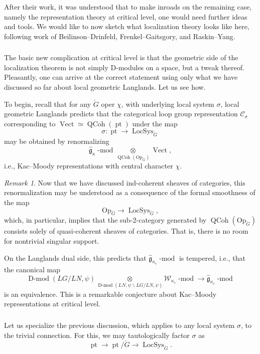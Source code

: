 \documentclass[10pt]{amsart}
\newcommand{\pt}{\on{pt}}
\newcommand{\fgc}{\widehat{\fg}_{\kappa_c}}
\newcommand{\fgk}{\widehat{\fg}_\kappa}
\newcommand{\Op}{\mathrm{Op}_{\cG}}
\newcommand{\LS}{\on{LocSys}_{\cG}}
\newcommand{\fg}{\mathfrak{g}}
\newcommand{\on}{\operatorname}
\renewcommand{\mod}{\on{-mod}}
\newcommand{\Dmod}{\on{D-mod}}
\newcommand{\Vect}{\on{Vect}}
\theoremstyle{remark}
\newtheorem{re}[subsubsection]{Remark}
\numberwithin{equation}{section}
\newcommand{\cG}{\check{G}}
\newcommand{\sC}{\mathscr{C}}
\renewcommand{\mod}{\operatorname{-mod}}
\newcommand{\QCoh}{\on{QCoh}}
\begin{document}
	 
	After their work, it was understood that to make inroads on the remaining case, namely the representation theory at critical level, one would need further ideas and tools. We would like to now 
	sketch what localization theory looks like here, following work of Beilinson--Drinfeld, Frenkel--Gaitsgory, and 
	Raskin--Yang. 
	
	\subsubsection{}  The basic new complication at critical level is that the geometric side of the localization theorem is not simply D-modules on a space, but a tweak thereof. Pleasantly, one can arrive at the correct statement using only what we have discussed so far about local geometric Langlands. Let us see how.
	
	
	
	To begin, recall that for any $\cG$ oper $\chi$, 
	with underlying local system $\sigma$, local geometric Langlands predicts 
	that the categorical loop group representation $\sC_{\sigma}$ corresponding 
	to $\Vect \simeq \QCoh(\pt)$ under the map $$\sigma: \pt \rightarrow \LS$$ 
	may be 
	obtained by renormalizing 
	\[
	  \fgk\mod \underset{\QCoh(\Op)} \otimes \Vect,
	\]
	i.e., Kac--Moody representations with central character $\chi$. 
	
	
   \begin{re} Now that we have discussed ind-coherent sheaves of categories, 
   this renormalization may be understood as a consequence of the formal smoothness of 
   the map $$\Op 
   \rightarrow \LS,$$which, in particular, implies that the sub-2-category 
   generated by $\QCoh(\Op)$ consists solely of quasi-coherent sheaves of categories. 
   That is, there is no room for nontrivial singular support.  
   
   On the Langlands dual side, this predicts that $\fgc\mod$ is tempered, i.e., 
   that the canonical map 
   \[
        \Dmod(LG/ LN, \psi ) \underset {\Dmod(LN, \psi \backslash LG / LN, 
        \psi)} \otimes \mathscr{W}_{\kappa_c}\mod \rightarrow \fgc\mod
   \]
   is an equivalence. This is a remarkable conjecture about Kac--Moody 
   representations at critical level. 
   \end{re}
	
	
	\subsubsection{} Let us specialize the previous discussion, which applies 
	to any local system $\sigma$, to  the trivial connection. For this, we may 
	tautologically factor $\sigma$ as
	\[
	  \pt \rightarrow \pt/\cG \rightarrow \LS.
	\]
	
\end{document}
